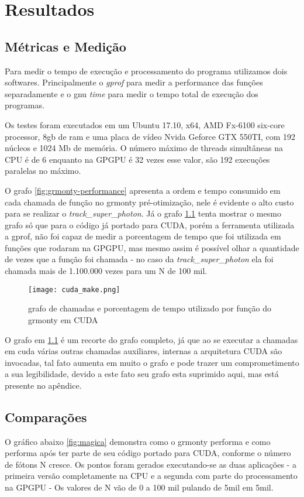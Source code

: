 \chapter{Resultados}
\label{cap:resultados}

\section{Métricas e Medição}
  Para medir o tempo  de execução e processamento  do programa utilizamos dois softwares. Principalmente o \textit{gprof} para medir a performance das funções separadamente e o gnu \textit{time} para medir o tempo total de execução dos programas.

  Os testes foram executados em um Ubuntu 17.10, x64, AMD Fx-6100 six-core processor, 8gb de ram e uma placa de vídeo Nvida Geforce GTX 550TI, com 192 núcleos e 1024 Mb de memória. O número máximo de threads simultâneas na CPU é de 6 enquanto na GPGPU é 32 vezes esse valor, são 192 execuções paralelas no máximo.

  O grafo \ref{fig:grmonty-performance} apresenta a ordem e tempo consumido em cada chamada de função no grmonty pré-otimização, nele é evidente o alto custo para se realizar o  \textit{track\_super\_photon}. Já o grafo \ref{fig:cudamake} tenta mostrar o mesmo grafo só que para o código já portado para CUDA, porém a ferramenta utilizada a gprof, não foi capaz de medir a porcentagem de tempo que foi utilizada em funções que rodaram na GPGPU, mas mesmo assim é possível olhar a quantidade de vezes que a função foi chamada - no caso da  \textit{track\_super\_photon} ela foi chamada mais de 1.100.000 vezes para um N de 100 mil.

  \begin{figure}[!h]
    \centering
    \texttt{[image: cuda\_make.png]}
    \caption{grafo de chamadas e porcentagem de tempo utilizado por função do grmonty em CUDA}
    \label{fig:cudamake}
  \end{figure}

  O grafo em \ref{fig:cudamake} é um recorte do grafo completo, já que ao se executar a chamadas em cuda várias outras chamadas auxiliares, internas a arquitetura CUDA são invocadas, tal fato aumenta em muito o grafo e pode trazer um comprometimento a sua legibilidade, devido a este fato seu grafo esta suprimido aqui, mas está presente no apêndice.

\section{Comparações}
  O gráfico abaixo \ref{fig:magica} demonstra como o grmonty performa e como performa após ter parte de seu código portado para CUDA, conforme o número de fótons N cresce. Os pontos foram gerados executando-se as duas aplicações -  a primeira versão completamente na CPU e a segunda com parte do processamento na GPGPU - Os valores de N vão de 0 a 100 mil pulando de 5mil em 5mil.

